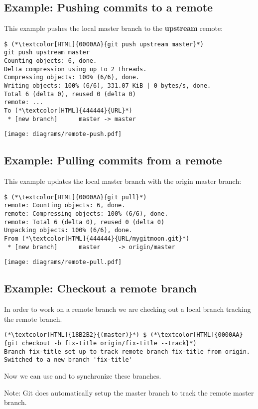 \subsection{Example: Pushing commits to a remote}
\begin{frame}[fragile]
  \subslidetitle
  This example pushes the local master branch to the \textbf{upstream} remote:
  \begin{lstlisting}
$ (*\textcolor[HTML]{0000AA}{git push upstream master}*)
git push upstream master
Counting objects: 6, done.
Delta compression using up to 2 threads.
Compressing objects: 100% (6/6), done.
Writing objects: 100% (6/6), 331.07 KiB | 0 bytes/s, done.
Total 6 (delta 0), reused 0 (delta 0)
remote: ...
To (*\textcolor[HTML]{444444}{URL}*)
 * [new branch]      master -> master
\end{lstlisting}
\vspace{-1.1em}
\center \texttt{[image: diagrams/remote-push.pdf]}
\end{frame}

\subsection{Example: Pulling commits from a remote}
\begin{frame}[fragile]
  \subslidetitle
  This example updates the local master branch with the origin master branch:
  \begin{lstlisting}
$ (*\textcolor[HTML]{0000AA}{git pull}*)
remote: Counting objects: 6, done.
remote: Compressing objects: 100% (6/6), done.
remote: Total 6 (delta 0), reused 0 (delta 0)
Unpacking objects: 100% (6/6), done.
From (*\textcolor[HTML]{444444}{URL/mygitmoon.git}*)
 * [new branch]      master     -> origin/master
\end{lstlisting}
\center \texttt{[image: diagrams/remote-pull.pdf]}
\end{frame}

\subsection{Example: Checkout a remote branch}
\begin{frame}[fragile]
  \subslidetitle
  In order to work on a remote branch we are checking out a local branch tracking the remote branch.

  \begin{lstlisting}
(*\textcolor[HTML]{18B2B2}{(master)}*) $ (*\textcolor[HTML]{0000AA}{git checkout -b fix-title origin/fix-title --track}*)
Branch fix-title set up to track remote branch fix-title from origin.
Switched to a new branch 'fix-title'
\end{lstlisting}
  \vspace{1em}
  Now we can use  and  to synchronize these branches.

  \vspace{1em}
  Note: Git does automatically setup the master branch to track the remote master branch.
\end{frame}

